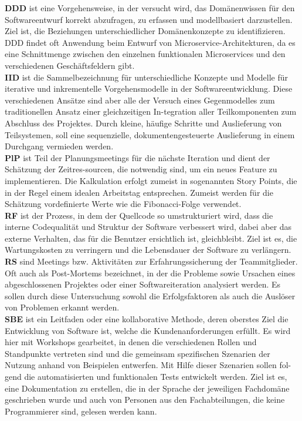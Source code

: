 \textbf{DDD} ist eine Vorgehensweise, in der versucht wird, das Domänenwissen für den Softwareentwurf korrekt abzufragen, zu erfassen und modellbasiert darzustellen. Ziel ist, die Beziehungen unterschiedlicher Domänenkonzepte zu identifizieren. 
DDD findet oft Anwendung beim Entwurf von Microservice-Architekturen, da es eine Schnittmenge zwischen den einzelnen funktionalen Microservices und den verschiedenen Geschäftsfeldern gibt.\cite{Rademacher2018-yo} \\

\textbf{IID} ist die Sammelbezeichnung für unterschiedliche Konzepte und Modelle für iterative und inkrementelle Vorgehensmodelle in der Softwareentwicklung. 
Diese verschiedenen Ansätze sind aber alle der Versuch eines Gegenmodelles zum traditionellen Ansatz einer gleichzeitigen In-tegration aller Teilkomponenten zum Abschluss des Projektes. 
Durch kleine, häufige Schritte und Auslieferung von Teilsystemen, soll eine sequenzielle, dokumentengesteuerte Auslieferung in einem Durchgang vermieden werden. \cite{Larman2003-fg} \\

\textbf{PlP}  ist Teil der Planungsmeetings für die nächste Iteration und dient der Schätzung der Zeitres-sourcen, die notwendig sind, um ein neues Feature zu implementieren. 
Die Kalkulation erfolgt zumeist in sogenannten Story Points, die in der Regel einem idealen Arbeitstag entsprechen. 
Zumeist werden für die Schätzung vordefinierte Werte wie die Fibonacci-Folge verwendet.
\cite{Mahnic2012-ve} \\

\textbf{RF} ist der Prozess, in dem der Quellcode so umstrukturiert wird, dass die interne Codequalität und Struktur der Software verbessert wird, dabei aber das externe Verhalten, das für die Benutzer ersichtlich ist, gleichbleibt. 
Ziel ist es, die Wartungskosten zu verringern und die Lebensdauer der Software zu verlängern.\cite{Kaur2019-wy} \\

\textbf{RS} sind Meetings bzw. Aktivitäten zur Erfahrungssicherung der Teammitglieder. 
Oft auch als Post-Mortems bezeichnet, in der die Probleme sowie Ursachen eines abgeschlossenen Projektes oder einer Softwareiteration analysiert werden. 
Es sollen durch diese Untersuchung sowohl die Erfolgsfaktoren als auch die Auslöser von Problemen erkannt werden.\cite{Lehtinen2014-ou} \\

\textbf{SBE} ist ein Leitfaden oder eine kollaborative Methode, deren oberstes Ziel die Entwicklung von Software ist, welche die Kundenanforderungen erfüllt. 
Es wird hier mit Workshops gearbeitet, in denen die verschiedenen Rollen und Standpunkte vertreten sind und die gemeinsam spezifischen Szenarien der Nutzung anhand von Beispielen entwerfen. 
Mit Hilfe dieser Szenarien sollen fol-gend die automatisierten und funktionalen Tests entwickelt werden. Ziel ist es, eine Dokumentation zu erstellen, 
die in der Sprache der jeweiligen Fachdomäne geschrieben wurde und auch von Personen aus den Fachabteilungen, die keine Programmierer sind, gelesen werden kann.\cite{Blasquez2017-og,Bache2014-cp} \\

